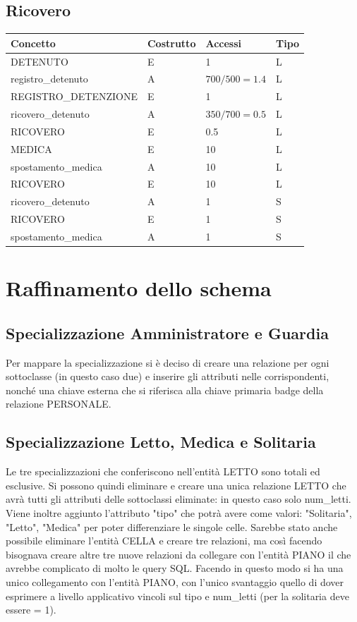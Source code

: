 \documentclass[a4paper,12pt]{report}
\begin{document}
\subsection{Ricovero}
\begin{table}[H]
\begin{tabular}{p{5cm} p{2cm} p{3cm} p{1cm}}
\hline
Concetto & Costrutto & Accessi & Tipo \\ \hline
DETENUTO & E & 1 & L \\
registro\_detenuto & A & \(700 / 500 = 1.4 \) & L \\
REGISTRO\_DETENZIONE & E & 1 & L \\
ricovero\_detenuto & A & \(350 / 700 = 0.5\) & L \\
RICOVERO & E & 0.5 & L \\
MEDICA & E & 10 & L \\
spostamento\_medica & A & 10 & L \\
RICOVERO & E & 10 & L \\
ricovero\_detenuto & A & 1 & S \\
RICOVERO & E & 1 & S \\
spostamento\_medica & A & 1 & S \\
\end{tabular}
\end{table}
\section{Raffinamento dello schema}
\subsection{Specializzazione Amministratore e Guardia}
Per mappare la specializzazione si è deciso di creare una relazione per ogni sottoclasse (in questo caso due) e inserire gli attributi nelle corrispondenti, nonché una chiave esterna che si riferisca alla chiave primaria badge della relazione PERSONALE. 
\subsection{Specializzazione Letto, Medica e Solitaria}
Le tre specializzazioni che conferiscono nell'entità LETTO sono totali ed esclusive.
%
Si possono quindi eliminare e creare una unica relazione LETTO che avrà tutti gli attributi delle sottoclassi eliminate: in questo caso solo num\_letti.
%
Viene inoltre aggiunto l'attributo "tipo" che potrà avere come valori: "Solitaria", "Letto", "Medica" per poter differenziare le singole celle.
%
Sarebbe stato anche possibile eliminare l'entità CELLA e creare tre relazioni, ma così facendo bisognava creare altre tre nuove relazioni da collegare con l'entità PIANO il che avrebbe complicato di molto le query SQL.
%
Facendo in questo modo si ha una unico collegamento con l'entità PIANO, con l'unico svantaggio quello di dover esprimere a livello applicativo vincoli sul tipo e num\_letti (per la solitaria deve essere = 1).
\end{document}
